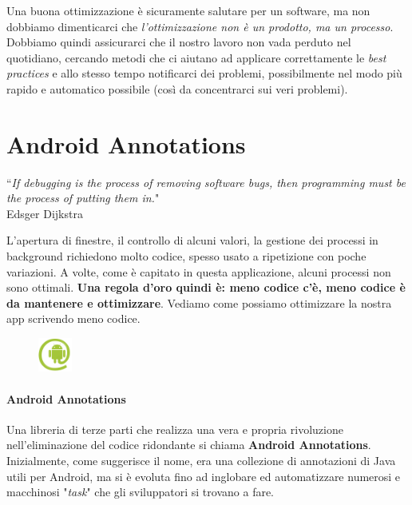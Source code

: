 \documentclass[a4paper,10pt]{memoir}
\begin{document}
Una buona ottimizzazione è sicuramente salutare per un software, ma non dobbiamo dimenticarci che \textit{l'ottimizzazione non è un prodotto, ma un processo}. Dobbiamo quindi assicurarci che il nostro lavoro non vada perduto nel quotidiano, cercando metodi che ci aiutano ad applicare correttamente le \textit{best practices} e allo stesso tempo notificarci dei problemi, possibilmente nel modo più rapido e automatico possibile (così da concentrarci sui veri problemi).

\section{Android Annotations}

\begin{flushright}
``\textit{If debugging is the process of removing software bugs, then programming must be the process of putting them in.}" \\ Edsger Dijkstra
\end{flushright}

L'apertura di finestre, il controllo di alcuni valori, la gestione dei processi in background richiedono molto codice, spesso usato a ripetizione con poche variazioni. A volte, come è capitato in questa applicazione, alcuni processi non sono ottimali. \textbf{Una regola d'oro quindi è: meno codice c'è, meno codice è da mantenere e ottimizzare}. Vediamo come possiamo ottimizzare la nostra app scrivendo meno codice.


\begin{figure}
\includegraphics[width=0.10\textwidth]{dev/aa}
\end{figure}

\paragraph{Android Annotations} Una libreria di terze parti che realizza una vera e propria rivoluzione nell'eliminazione del codice ridondante si chiama \textbf{Android Annotations}. Inizialmente, come suggerisce il nome, era una collezione di annotazioni di Java utili per Android, ma si è evoluta fino ad inglobare ed automatizzare numerosi e macchinosi "\textit{task}" che gli sviluppatori si trovano a fare.

\medskip
\end{document}
